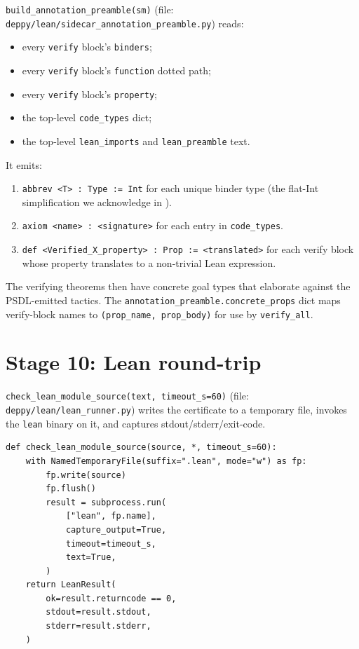 \texttt{build\_annotation\_preamble(sm)} (file:
\texttt{deppy/lean/sidecar\_annotation\_preamble.py}) reads:
\begin{itemize}[leftmargin=1.7em]
  \item every \texttt{verify} block's \texttt{binders};
  \item every \texttt{verify} block's \texttt{function} dotted path;
  \item every \texttt{verify} block's \texttt{property};
  \item the top-level \texttt{code\_types} dict;
  \item the top-level \texttt{lean\_imports} and
    \texttt{lean\_preamble} text.
\end{itemize}

It emits:

\begin{enumerate}[leftmargin=1.7em]
  \item \texttt{abbrev <T> : Type := Int} for each unique
    binder type (the flat-Int simplification we acknowledge in
    ).
  \item \texttt{axiom <name> : <signature>} for each entry in
    \texttt{code\_types}.
  \item \texttt{def <Verified\_X\_property> : Prop := <translated>}
    for each verify block whose property translates to a non-trivial
    Lean expression.
\end{enumerate}

The verifying theorems then have concrete goal types that elaborate
against the PSDL-emitted tactics.  The
\texttt{annotation\_preamble.concrete\_props} dict maps verify-block
names to \texttt{(prop\_name, prop\_body)} for use by
\texttt{verify\_all}.

\section{Stage 10: Lean round-trip}
\label{sec:lean-roundtrip}

\texttt{check\_lean\_module\_source(text, timeout\_s=60)} (file:
\texttt{deppy/lean/lean\_runner.py}) writes the certificate to a
temporary file, invokes the \texttt{lean} binary on it, and
captures stdout/stderr/exit-code.

\begin{lstlisting}[caption={Outline of \texttt{check\_lean\_module\_source}.}]
def check_lean_module_source(source, *, timeout_s=60):
    with NamedTemporaryFile(suffix=".lean", mode="w") as fp:
        fp.write(source)
        fp.flush()
        result = subprocess.run(
            ["lean", fp.name],
            capture_output=True,
            timeout=timeout_s,
            text=True,
        )
    return LeanResult(
        ok=result.returncode == 0,
        stdout=result.stdout,
        stderr=result.stderr,
    )
\end{lstlisting}

